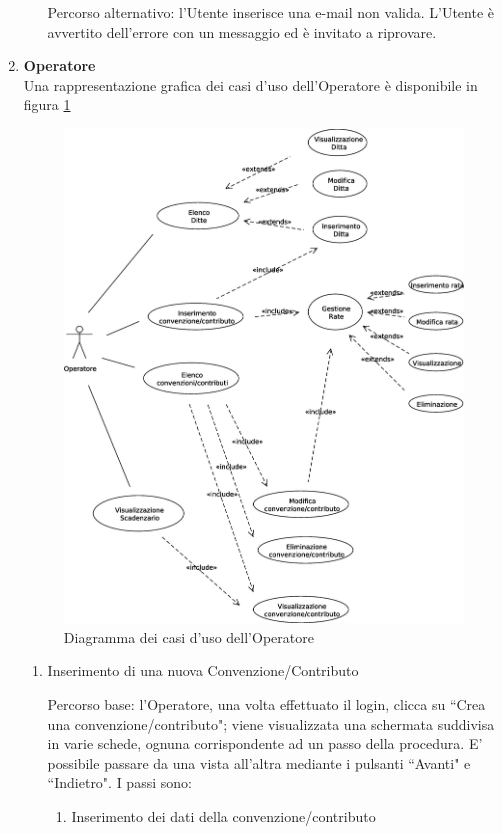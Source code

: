 \begin{enumerate}
\begin{enumerate}
  Percorso alternativo:
  l'Utente inserisce una e-mail non valida. L'Utente è avvertito dell'errore con un messaggio ed è invitato a riprovare.
\end{enumerate}



\item \textbf{Operatore}\\
Una rappresentazione grafica dei casi d'uso dell'Operatore è disponibile in figura \ref{use_case_diag_operator}
\begin{figure}[h]
  \caption{Diagramma dei casi d'uso dell'Operatore}
  \label{use_case_diag_operator}
  \centering
    \includegraphics[width=1\textwidth]{images/casi_uso_operatore.eps}
\end{figure}

\begin{enumerate}
  \item Inserimento di una nuova Convenzione/Contributo\\ \label{UC_new_contract}
  
  Percorso base:
  l'Operatore, una volta effettuato il login, clicca su ``Crea una convenzione/contributo"; viene visualizzata una schermata suddivisa in varie schede,
  ognuna corrispondente ad un passo della procedura. E' possibile passare da una vista all'altra mediante i pulsanti ``Avanti" e ``Indietro". I passi sono:
  \begin{enumerate}
    \item Inserimento dei dati della convenzione/contributo\\
      

\end{enumerate}
\end{enumerate}
\end{enumerate}

